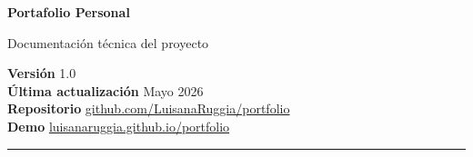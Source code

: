\documentclass[10pt]{article}
\begin{document}
\sloppy

\noindent
\begin{minipage}{0.7\textwidth}
  \raggedright
  {\color{accent}\fontsize{42}{50}\selectfont\bfseries Portafolio Personal\par}
  \vspace{6pt}
  {\color{mutedtext}\Large Documentación técnica del proyecto}
\end{minipage}
\hfill
\begin{minipage}{0.28\textwidth}
  \raggedleft\small\color{mutedtext}
  \textbf{Versión} 1.0 \\
  \textbf{Última actualización} Mayo 2026 \\
  \textbf{Repositorio} \href{https://github.com/LuisanaRuggia/portfolio}{github.com/LuisanaRuggia/portfolio} \\
  \textbf{Demo} \href{https://luisanaruggia.github.io/portfolio/}{luisanaruggia.github.io/portfolio}
\end{minipage}

\vspace{6pt}
\noindent\textcolor{accent}{\rule{\linewidth}{2pt}}
\vspace{14pt}
\end{document}
